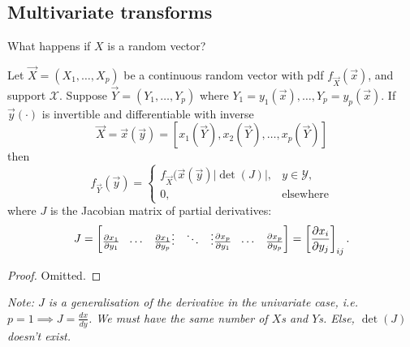 \documentclass[10pt, a4paper]{article}
\begin{document}
\subsection{Multivariate transforms}
What happens if $X$ is a random vector?

\begin{proposition}
    Let $\vec{X} = (X_1, \dotsc, X_p)$ be a continuous random vector with pdf $f_{\vec{X}}(\vec{x})$,
    and support $\mathcal{X}$.
    Suppose $\vec{Y} = (Y_1, \dotsc, Y_p)$ where $Y_1 = y_1(\vec{x}), \dotsc, Y_p = y_p(\vec{x})$.
    If $\vec{y}(\cdot)$ is invertible and differentiable with inverse
    \[
    \vec{X} = \vec{x}(\vec{y}) = [x_1(\vec{Y}), x_2(\vec{Y}), \dotsc, x_p(\vec{Y})]
    \]
    then
    \[
    f_{\vec{Y}}(\vec{y}) = \begin{cases}
        f_{\vec{X}}(\vec{x}(\vec{y})|\det(J)|, & y \in \mathcal{Y}, \\
        0, &\text{elsewhere}
    \end{cases}
    \]
    where $J$ is the Jacobian matrix of partial derivatives:
    \[
    J = \begin{bmatrix}
        \pd[x_1]{y_1} & \dotsi & \pd[x_1]{y_p}
        \vdots & \ddots & \vdots
        \pd[x_p]{y_1} & \dotsi & \pd[x_p]{y_p}
    \end{bmatrix} = \left[\pd[x_i]{y_j}\right]_{ij}.
    \]

    \begin{proof}
        Omitted.
    \end{proof}
\end{proposition}

\textit{Note:
$J$ is a generalisation of the derivative in the univariate case,
i.e. $p = 1 \implies J = \frac{dx}{dy}$.
We must have the same number of $X$s and $Y$s.
Else,
$\det(J)$ doesn't exist.}
\end{document}

